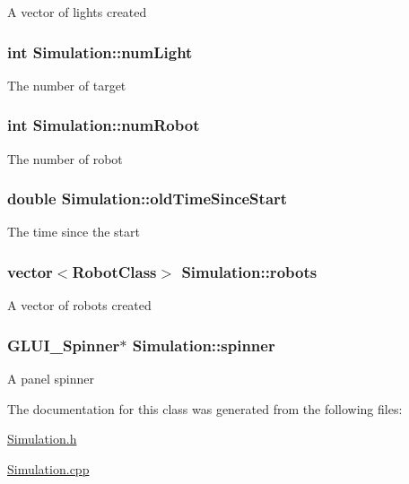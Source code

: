 A vector of lights created \hypertarget{classSimulation_a792ef5172ff14046a641661ce2a95041}{
\subsubsection[{num\-Light}]{\setlength{\rightskip}{0pt plus 5cm}int Simulation\-::num\-Light\hspace{0.3cm}{\ttfamily [private]}}}\label{classSimulation_a792ef5172ff14046a641661ce2a95041}
The number of target \hypertarget{classSimulation_aed3fe9fceae4a68746206b7a2f9e9d7f}{
\subsubsection[{num\-Robot}]{\setlength{\rightskip}{0pt plus 5cm}int Simulation\-::num\-Robot\hspace{0.3cm}{\ttfamily [private]}}}\label{classSimulation_aed3fe9fceae4a68746206b7a2f9e9d7f}
The number of robot \hypertarget{classSimulation_a9d5a2c76548907940c15b389344365df}{
\subsubsection[{old\-Time\-Since\-Start}]{\setlength{\rightskip}{0pt plus 5cm}double Simulation\-::old\-Time\-Since\-Start\hspace{0.3cm}{\ttfamily [private]}}}\label{classSimulation_a9d5a2c76548907940c15b389344365df}
The time since the start \hypertarget{classSimulation_ac48312060cc6b3b973bba8c802b45bce}{
\subsubsection[{robots}]{\setlength{\rightskip}{0pt plus 5cm}vector$<${\bf Robot\-Class}$>$ Simulation\-::robots\hspace{0.3cm}{\ttfamily [private]}}}\label{classSimulation_ac48312060cc6b3b973bba8c802b45bce}
A vector of robots created \hypertarget{classSimulation_ade4b147d7d59002d1ea81b60bba84b48}{
\subsubsection[{spinner}]{\setlength{\rightskip}{0pt plus 5cm}G\-L\-U\-I\-\_\-\-Spinner$\ast$ Simulation\-::spinner\hspace{0.3cm}{\ttfamily [private]}}}\label{classSimulation_ade4b147d7d59002d1ea81b60bba84b48}
A panel spinner 

The documentation for this class was generated from the following files\-:\begin{DoxyCompactItemize}
\item 
\hyperlink{Simulation_8h}{Simulation.\-h}\item 
\hyperlink{Simulation_8cpp}{Simulation.\-cpp}\end{DoxyCompactItemize}

